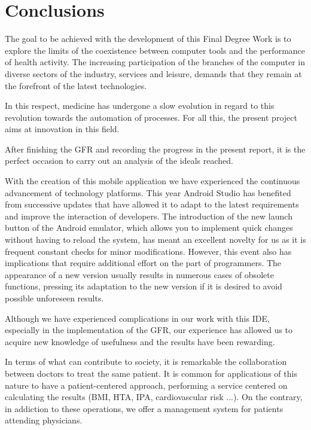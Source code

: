 \documentclass[11pt,spanish,
		listoftables,listoffigures]
		{tfgplantilla}
\begin{document}
\addtocounter{chapter}{-1}
\chapter{Conclusions}

The goal to be achieved with the development of this Final Degree Work is to explore the limits of the coexistence between computer tools and the performance of health activity. The increasing participation of the branches of the computer in diverse sectors of the industry, services and leisure, demands that they remain at the forefront of the latest technologies.

In this respect, medicine has undergone a slow evolution in regard to this revolution towards the automation of processes. For all this, the present project aims at innovation in this field.

After finishing the GFR and recording the progress in the present report, it is the perfect occasion to carry out an analysis of the ideals reached.

With the creation of this mobile application we have experienced the continuous advancement of technology platforms. This year Android Studio has benefited from successive updates that have allowed it to adapt to the latest requirements and improve the interaction of developers. The introduction of the new launch button of the Android emulator, which allows you to implement quick changes without having to reload the system, has meant an excellent novelty for us as it is frequent constant checks for minor modifications. However, this event also has implications that require additional effort on the part of programmers. The appearance of a new version usually results in numerous cases of obsolete functions, pressing its adaptation to the new version if it is desired to avoid possible unforeseen results.

Although we have experienced complications in our work with this IDE, especially in the implementation of the GFR, our experience has allowed us to acquire new knowledge of usefulness and the results have been rewarding.

In terms of what can contribute to society, it is remarkable the collaboration between doctors to treat the same patient. It is common for applications of this nature to have a patient-centered approach, performing a service centered on calculating the results (BMI, HTA, IPA, cardiovascular risk ...). On the contrary, in addiction to these operations, we offer a management system for patients attending physicians.
\end{document}
